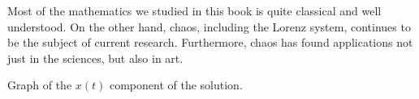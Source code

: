 \documentclass{ximera}
\begin{document}
Most of the mathematics we studied in this book is quite classical and well understood. On the other hand, chaos, including the Lorenz system, continues to be the subject of current research. Furthermore, chaos has found applications not just in the sciences, but also in art.

\begin{myfig}
    \capstart
    \caption{Graph of the $x(t)$ component of the solution.
    \label{nlin:lorenz-graphx}}
\end{myfig}
\end{document}
